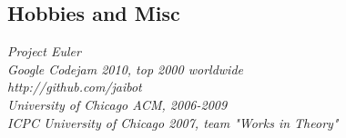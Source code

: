 \documentclass[9pt]{res} %
\begin{document}
\begin{resume}
\section{Hobbies and Misc} 

{\it Project Euler} \\
{\it Google Codejam 2010, top 2000 worldwide} \\
{\it http://github.com/jaibot } \\
{\it University of Chicago ACM, 2006-2009} \\
{\it ICPC University of Chicago 2007, team "Works in Theory"}



\end{resume}
\end{document}
